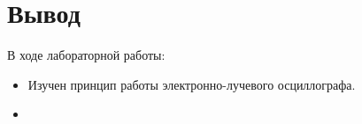 \section{Вывод}
В ходе лабораторной работы:
\begin{itemize}
\item
  Изучен принцип работы электронно-лучевого осциллографа.
\item
\end{itemize}
\clearpage

